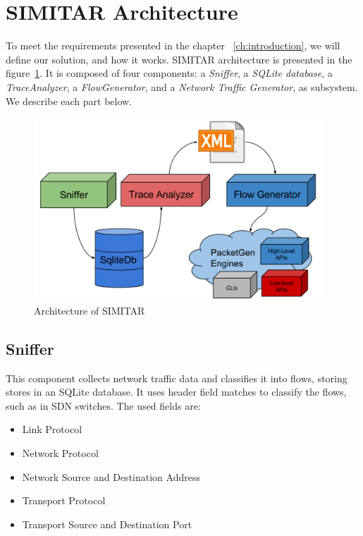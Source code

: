 \section{SIMITAR Architecture}


To meet the requirements presented in the chapter ~\ref{ch:introduction}, we will define our solution, and how it works. SIMITAR architecture is presented in the figure~\ref{fig:architecture}. It is composed of four components: a \textit{Sniffer}, a \textit{SQLite database}, a \textit{TraceAnalyzer}, a \textit{FlowGenerator},  and a \textit{Network Traffic Generator}, as subsystem. We describe each part below.

\begin{figure}[ht!]
        \centering
        \includegraphics[height=2.7in]{figures/ch3/architecture-diagram}
        \caption{Architecture of SIMITAR}
    \label{fig:architecture}
\end{figure}


\subsection{Sniffer}



This component collects network traffic data and classifies it into flows, storing stores in an SQLite database. It uses header field matches to classify the flows, such as in SDN switches\cite{sdn-survey}. The used fields are:

\begin{itemize}
\item Link Protocol
\item Network Protocol
\item Network Source and Destination Address
\item Transport Protocol
\item Transport Source and Destination Port
\end{itemize}

